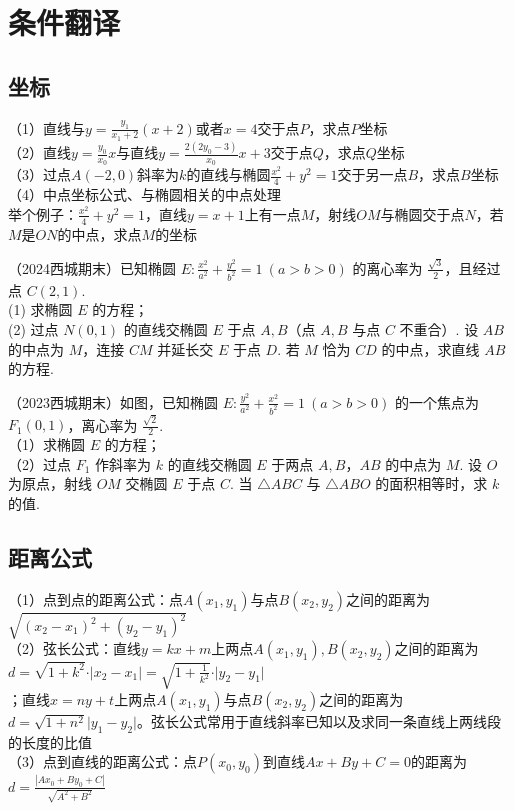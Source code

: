 

\section{条件翻译}
\subsection{坐标}
\noindent（1）直线与$y=\frac{y_1}{x_1 + 2}(x + 2)$或者$x = 4$交于点$P$，求点$P$坐标 \\
（2）直线$y = \frac{y_0}{x_0}x$与直线$y = \frac{2(2y_0 - 3)}{x_0}x + 3$交于点$Q$，求点$Q$坐标 \\
（3）过点$A(-2, 0)$斜率为$k$的直线与椭圆$\frac{x^2}{4} + y^2 = 1$交于另一点$B$，求点$B$坐标 \\
（4）中点坐标公式、与椭圆相关的中点处理\\
举个例子：$\frac{x^2}{4} + y^2 = 1$，直线$y = x+ 1$上有一点$M$，射线$OM$与椭圆交于点$N$，若$M$是$ON$的中点，求点$M$的坐标

\begin{example} %
（2024西城期末）已知椭圆 $E:\frac{x^{2}}{a^{2}}+\frac{y^{2}}{b^{2}}=1\ (a>b>0)$ 的离心率为 $\frac{\sqrt{3}}{2}$，且经过点 $C(2,1)$.\\
(1) 求椭圆 $E$ 的方程；\\
(2) 过点 $N(0,1)$ 的直线交椭圆 $E$ 于点 $A,B$（点 $A,B$ 与点 $C$ 不重合）. 设 $AB$ 的中点为 $M$，连接 $CM$ 并延长交 $E$ 于点 $D$. 若 $M$ 恰为 $CD$ 的中点，求直线 $AB$ 的方程.

\end{example}

\begin{example} %
（2023西城期末）如图，已知椭圆 $E:\frac{y^2}{a^2}+\frac{x^2}{b^2}=1\ (a>b>0)$ 的一个焦点为 $F_1(0,1)$，离心率为 $\frac{\sqrt{2}}{2}$.\\
（1）求椭圆 $E$ 的方程；\\
（2）过点 $F_1$ 作斜率为 $k$ 的直线交椭圆 $E$ 于两点 $A,B$，$AB$ 的中点为 $M$. 设 $O$ 为原点，射线 $OM$ 交椭圆 $E$ 于点 $C$. 当 $\triangle ABC$ 与 $\triangle ABO$ 的面积相等时，求 $k$ 的值.
\end{example}


\subsection{距离公式}
\noindent （1）点到点的距离公式：点$A(x_1, y_1)$与点$B(x_2, y_2)$之间的距离为$\sqrt{(x_2 - x_1)^2 + (y_2 - y_1)^2}$ \\
（2）弦长公式：直线$y = kx + m$上两点$A(x_1, y_1), B(x_2, y_2)$之间的距离为$d = \sqrt{1 + k^2} \cdot \vert x_2 - x_1\vert = \sqrt{1 + \frac{1}{k^2}} \cdot \vert y_2 - y_1\vert$\\；直线$x = ny + t$上两点$A(x_1,y_1)$与点$B(x_2, y_2)$之间的距离为$d = \sqrt{1 + n^2}\vert y_1 -y_2 \vert$。弦长公式常用于直线斜率已知以及求同一条直线上两线段的长度的比值\\
（3）点到直线的距离公式：点$P(x_0, y_0)$到直线$Ax + By + C = 0$的距离为$d = \frac{|Ax_0 + By_0 + C|}{\sqrt{A^2 + B^2}}$


